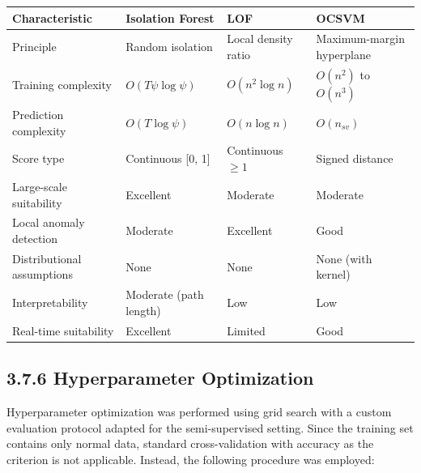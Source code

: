\documentclass[
  a4paper]{report}
\newcounter{none} %
\begin{document}
{\def\LTcaptype{none} %
\begin{longtable}[]{@{}
  >{\raggedright\arraybackslash}p{}
  >{\raggedright\arraybackslash}p{}
  >{\raggedright\arraybackslash}p{}
  >{\raggedright\arraybackslash}p{}@{}}
\toprule\noalign{}
\begin{minipage}[b]{\linewidth}\raggedright
Characteristic
\end{minipage} & \begin{minipage}[b]{\linewidth}\raggedright
Isolation Forest
\end{minipage} & \begin{minipage}[b]{\linewidth}\raggedright
LOF
\end{minipage} & \begin{minipage}[b]{\linewidth}\raggedright
OCSVM
\end{minipage} \\
\midrule\noalign{}
\endhead
\bottomrule\noalign{}
\endlastfoot
Principle & Random isolation & Local density ratio & Maximum-margin
hyperplane \\
Training complexity & \(O(T \psi \log \psi)\) & \(O(n^2 \log n)\) &
\(O(n^2)\) to \(O(n^3)\) \\
Prediction complexity & \(O(T \log \psi)\) & \(O(n \log n)\) &
\(O(n_{sv})\) \\
Score type & Continuous {[}0, 1{]} & Continuous \(\geq 1\) & Signed
distance \\
Large-scale suitability & Excellent & Moderate & Moderate \\
Local anomaly detection & Moderate & Excellent & Good \\
Distributional assumptions & None & None & None (with kernel) \\
Interpretability & Moderate (path length) & Low & Low \\
Real-time suitability & Excellent & Limited & Good \\
\end{longtable}
}

\subsection{3.7.6 Hyperparameter
Optimization}\label{hyperparameter-optimization}

Hyperparameter optimization was performed using grid search with a
custom evaluation protocol adapted for the semi-supervised setting.
Since the training set contains only normal data, standard
cross-validation with accuracy as the criterion is not applicable.
Instead, the following procedure was employed:
\end{document}

